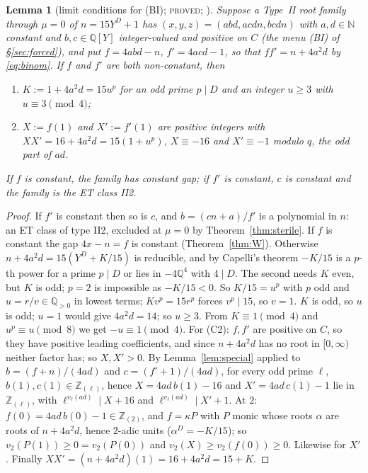 \documentclass[11pt,reqno]{amsart}
\newtheorem{lemma}[theorem]{Lemma}
\theoremstyle{definition}
\newcommand{\Z}{\mathbb Z}
\newcommand{\Q}{\mathbb Q}
\newcommand{\N}{\mathbb N}
\newcommand{\status}[1]{\textup{\textsc{#1}}}
\begin{document}
\begin{lemma}[limit conditions for (BI); \status{proved}; {\cite[Lemma~2.1]{Exp15}}]\label{lem:iiadlimit}
Suppose a Type~II root family through $\mu=0$ of $n=15Y^D+1$ has
$(x,y,z)=(abd,acdn,bcdn)$ with $a,d\in\N$ constant and $b,c\in\Q[Y]$
integer-valued and positive on $C$ \textup{(}the menu \textup{(BI)} of
\S\ref{sec:forced}\textup{)}, and put $f=4abd-n$, $f'=4acd-1$, so that
$ff'=n+4a^2d$ by \eqref{eq:binom}.  If $f$ and $f'$ are both non-constant,
then
\begin{enumerate}
\item[(C1)] $K:=1+4a^2d=15u^p$ for an odd prime $p\mid D$ and an integer
$u\ge3$ with $u\equiv3\pmod 4$;
\item[(C2)] $X:=f(1)$ and $X':=f'(1)$ are positive integers with
$XX'=16+4a^2d=15(1+u^p)$, $X\equiv-16$ and $X'\equiv-1$ modulo $q$, the odd
part of $ad$.
\end{enumerate}
If $f$ is constant, the family has constant gap; if $f'$ is constant, $c$
is constant and the family is the ET class II2.
\end{lemma}

\begin{proof}
If $f'$ is constant then so is $c$, and $b=(cn+a)/f'$ is a polynomial in $n$:
an ET class of type II2, excluded at $\mu=0$ by Theorem~\ref{thm:sterile}.
If $f$ is constant the gap $4x-n=f$ is constant (Theorem~\ref{thm:W}).
Otherwise $n+4a^2d=15(Y^D+K/15)$ is reducible, and by Capelli's theorem
$-K/15$ is a $p$-th power for a prime $p\mid D$ or lies in $-4\Q^4$ with
$4\mid D$.  The second needs $K$ even, but $K$ is odd; $p=2$ is impossible as
$-K/15<0$.  So $K/15=u^p$ with $p$ odd and $u=r/v\in\Q_{>0}$ in lowest terms;
$Kv^p=15r^p$ forces $v^p\mid15$, so $v=1$.  $K$ is odd, so $u$ is odd;
$u=1$ would give $4a^2d=14$; so $u\ge3$.  From $K\equiv1\pmod4$ and
$u^p\equiv u\pmod 8$ we get $-u\equiv1\pmod4$.  For (C2): $f,f'$ are positive
on $C$, so they have positive leading coefficients, and since $n+4a^2d$ has
no root in $[0,\infty)$ neither factor has; so $X,X'>0$.  By
Lemma~\ref{lem:special} applied to $b=(f+n)/(4ad)$ and $c=(f'+1)/(4ad)$, for
every odd prime $\ell$, $b(1),c(1)\in\Z_{(\ell)}$, hence $X=4ad\,b(1)-16$ and
$X'=4ad\,c(1)-1$ lie in $\Z_{(\ell)}$, with $\ell^{v_\ell(ad)}\mid X+16$ and
$\ell^{v_\ell(ad)}\mid X'+1$.  At $2$: $f(0)=4ad\,b(0)-1\in\Z_{(2)}$, and
$f=\kappa P$ with $P$ monic whose roots $\alpha$ are roots of $n+4a^2d$, hence
$2$-adic units ($\alpha^D=-K/15$); so $v_2(P(1))\ge0=v_2(P(0))$ and
$v_2(X)\ge v_2(f(0))\ge0$.  Likewise for $X'$.  Finally
$XX'=(n+4a^2d)(1)=16+4a^2d=15+K$.
\end{proof}
\end{document}
